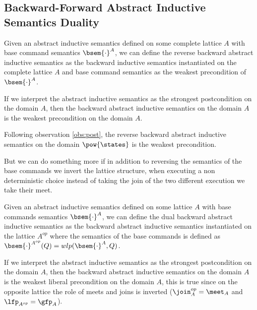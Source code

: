 \subsection{Backward-Forward Abstract Inductive Semantics Duality}

\begin{definition}
  Given an abstract inductive semantics defined on some complete lattice $A$ 
  with base command semantics $\bsem{\cdot}^A$, we can define the reverse
  backward abstract inductive semantics as the backward inductive semantics
  instantiated on the complete lattice $A$ and base command semantics 
  as the weakest precondition of $\bsem{\cdot}^A$.
\end{definition}

If we interpret the abstract inductive semantics as the strongest postcondition
on the domain $A$, then the backward abstract inductive semantics on the domain 
$A$ is the weakest precondition on the domain $A$.

\begin{observation}
  \label{obs:weakest-precondition}
  Following observation \ref{obs:post}, the reverse backward 
  abstract inductive semantics on the domain $\pow{\states}$ is the weakest 
  precondition.
\end{observation}

But we can do something more if in addition to reversing the semantics of the 
base commands we invert the lattice structure, when executing a non 
deterministic choice instead of taking the join of the two different execution
we take their meet.

\begin{definition}
  Given an abstract inductive semantics defined on some lattice $A$ with
  base commands semantics $\bsem{\cdot}^A$, we can define the dual backward 
  abstract inductive semantics as the backward abstract inductive semantics
  instantiated on the lattice $A^{op}$ where the semantics of the
  base commands is defined as $\bsem{\cdot}^{A^{op}}(Q) = wlp(\bsem{\cdot}^A, Q)$.
\end{definition}

If we interpret the abstract inductive semantics as the strongest postcondition
on the domain $A$, then the backward abstract inductive semantics on the domain 
$A$ is the weakest liberal precondition on the domain $A$, this is true since on 
the opposite lattice the role of meets and joins is inverted ($\join_A^{op} = 
\meet_A$ and $\lfp_{A^{op}} = \gfp_A$).

